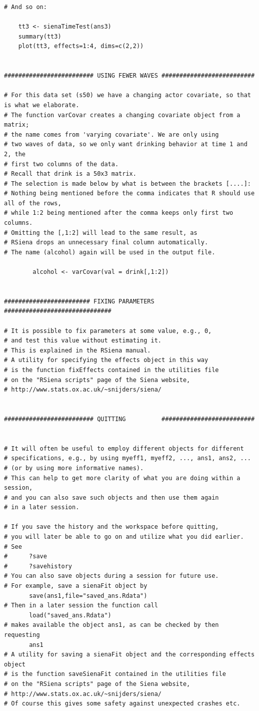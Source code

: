 \documentclass[a4paper,fleqn]{article}
\newcommand{\+}{\, + \,}
\begin{document}
{\begin{verbatim}
# And so on:

    tt3 <- sienaTimeTest(ans3)
    summary(tt3)
    plot(tt3, effects=1:4, dims=c(2,2))


######################### USING FEWER WAVES ##########################

# For this data set (s50) we have a changing actor covariate, so that is what we elaborate.
# The function varCovar creates a changing covariate object from a matrix;
# the name comes from 'varying covariate'. We are only using
# two waves of data, so we only want drinking behavior at time 1 and 2, the
# first two columns of the data.
# Recall that drink is a 50x3 matrix.
# The selection is made below by what is between the brackets [....]:
# Nothing being mentioned before the comma indicates that R should use all of the rows,
# while 1:2 being mentioned after the comma keeps only first two columns.
# Omitting the [,1:2] will lead to the same result, as
# RSiena drops an unnecessary final column automatically.
# The name (alcohol) again will be used in the output file.

        alcohol <- varCovar(val = drink[,1:2])


######################## FIXING PARAMETERS ##############################

# It is possible to fix parameters at some value, e.g., 0,
# and test this value without estimating it.
# This is explained in the RSiena manual.
# A utility for specifying the effects object in this way
# is the function fixEffects contained in the utilities file
# on the "RSiena scripts" page of the Siena website,
# http://www.stats.ox.ac.uk/~snijders/siena/


######################### QUITTING          ##########################


# It will often be useful to employ different objects for different
# specifications, e.g., by using myeff1, myeff2, ..., ans1, ans2, ...
# (or by using more informative names).
# This can help to get more clarity of what you are doing within a session,
# and you can also save such objects and then use them again
# in a later session.

# If you save the history and the workspace before quitting,
# you will later be able to go on and utilize what you did earlier.
# See
#      ?save
#      ?savehistory
# You can also save objects during a session for future use.
# For example, save a sienaFit object by
       save(ans1,file="saved_ans.Rdata")
# Then in a later session the function call
       load("saved_ans.Rdata")
# makes available the object ans1, as can be checked by then requesting
       ans1
# A utility for saving a sienaFit object and the corresponding effects object
# is the function saveSienaFit contained in the utilities file
# on the "RSiena scripts" page of the Siena website,
# http://www.stats.ox.ac.uk/~snijders/siena/
# Of course this gives some safety against unexpected crashes etc.


\end{verbatim}}
\end{document}
